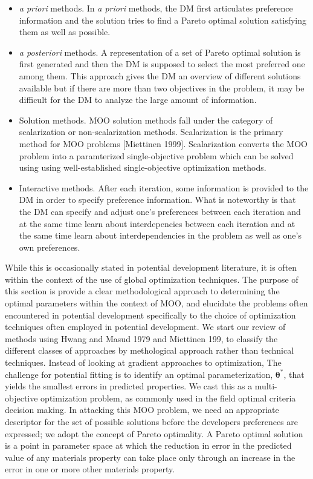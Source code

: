 \begin{itemize}
	\item {\emph{a priori} methods}.  In \emph{a priori} methods, the DM first articulates preference information and the solution tries to find a Pareto optimal solution satisfying them as well as possible.
  \item \emph{a posteriori} methods.  A representation of a set of Pareto optimal solution is first generated and then the DM is supposed to select the most preferred one among them.  This approach gives the DM an overview of different solutions available but if there are more than two objectives in the problem, it may be difficult for the DM to analyze the large amount of information.
	\item Solution methods.  MOO solution methods fall under the category of scalarization or non-scalarization methods.  Scalarization is the primary method for MOO problems [Miettinen 1999].  Scalarization converts the MOO problem into a paramterized single-objective problem which can be solved using using well-established single-objective optimization methods.
	\item Interactive methods.  After each iteration, some information is provided to the DM in order to specify preference information.  What is noteworthy is that the DM can specify and adjust one's preferences between each iteration and at the same time learn about interdepencies between each iteration and at the same time learn about interdependencies in the problem as well as one's own preferences.
\end{itemize}

While this is occasionally stated in potential development literature, it is often within the context of the use of global optimization techniques.
The purpose of this section is provide a clear methodological approach to determining the optimal parameters within the context of MOO, and elucidate the problems often encountered in potential development specifically to the choice of optimization techniques often employed in potential development.
We start our review of methods using Hwang and Masud 1979 and Miettinen 199, to classify the different classes of approaches by methological approach rather than technical techniques.
Instead of looking at gradient approaches to optimization,
The challenge for potential fitting is to identify an optimal parameterization, $\bm{\theta}^*$, that yields the smallest errors in predicted properties.  We cast this as a multi-objective optimization problem, as commonly used in the field optimal criteria decision making.  In attacking this MOO problem, we need an appropriate descriptor for the set of possible solutions before the developers preferences are expressed; we adopt the concept of Pareto optimality. A Pareto optimal solution is a point in parameter space at which the reduction in error in the predicted value of any materials property can take place only through an increase in the error in one or more other materials property.

